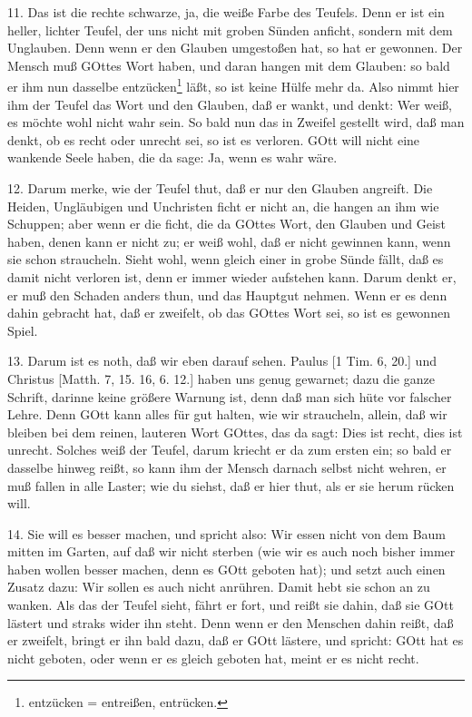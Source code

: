 11. Das ist die rechte schwarze, ja, die weiße Farbe des Teufels. Denn er ist ein heller, lichter Teufel, der uns nicht mit groben Sünden anficht, sondern mit dem Unglauben. Denn wenn er den Glauben umgestoßen hat, so hat er gewonnen. Der Mensch muß GOttes Wort haben, und daran hangen mit dem Glauben: so bald er ihm nun dasselbe entzücken\footnote{entzücken = entreißen, entrücken.} läßt, so ist keine Hülfe mehr da. Also nimmt hier ihm der Teufel das Wort und den Glauben, daß er wankt, und denkt: Wer weiß, es möchte wohl nicht wahr sein. So bald nun das in Zweifel gestellt wird, daß man denkt, ob es recht oder unrecht sei, so ist es verloren. GOtt will nicht eine wankende Seele haben, die da sage: Ja, wenn es wahr wäre.

12. Darum merke, wie der Teufel thut, daß er nur den Glauben angreift. Die Heiden, Ungläubigen und Unchristen ficht er nicht an, die hangen an ihm wie Schuppen; aber wenn er die ficht, die da GOttes Wort, den Glauben und Geist haben, denen kann er nicht zu; er weiß wohl, daß er nicht gewinnen kann, wenn sie schon straucheln. Sieht wohl, wenn gleich einer in grobe Sünde fällt, daß es damit nicht verloren ist, denn er immer wieder aufstehen kann. Darum denkt er, er muß den Schaden anders thun, und das Hauptgut nehmen. Wenn er es denn dahin gebracht hat, daß er zweifelt, ob das GOttes Wort sei, so ist es gewonnen Spiel.

13. Darum ist es noth, daß wir eben darauf sehen. Paulus [1 Tim. 6, 20.] und Christus [Matth. 7, 15. 16, 6. 12.] haben uns genug gewarnet; dazu die ganze Schrift, darinne keine größere Warnung ist, denn daß man sich hüte vor falscher Lehre. Denn GOtt kann alles für gut halten, wie wir straucheln, allein, daß wir bleiben bei dem reinen, lauteren Wort GOttes, das da sagt: Dies ist recht, dies ist unrecht. Solches weiß der Teufel, darum kriecht er da zum ersten ein; so bald er dasselbe hinweg reißt, so kann ihm der Mensch darnach selbst nicht wehren, er muß fallen in alle Laster; wie du siehst, daß er hier thut, als er sie herum rücken will.

14. Sie will es besser machen, und spricht also: Wir essen nicht von dem Baum mitten im Garten, auf daß wir nicht sterben (wie wir es auch noch bisher immer haben wollen besser machen, denn es GOtt geboten hat); und setzt auch einen Zusatz dazu: Wir sollen es auch nicht anrühren. Damit hebt sie schon an zu wanken. Als das der Teufel sieht, fährt er fort, und reißt sie dahin, daß sie GOtt lästert und straks wider ihn steht. Denn wenn er den Menschen dahin
reißt, daß er zweifelt, bringt er ihn bald dazu, daß er GOtt lästere, und spricht: GOtt hat es nicht geboten, oder wenn er es gleich geboten hat, meint er es nicht recht.

